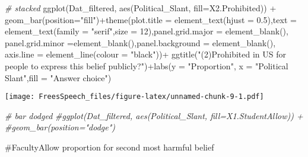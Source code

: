 \documentclass[
]{article}
\newenvironment{Shaded}{\begin{snugshade}}{\end{snugshade}}
\newcommand{\AttributeTok}[1]{\textcolor[rgb]{0.77,0.63,0.00}{#1}}
\newcommand{\CommentTok}[1]{\textcolor[rgb]{0.56,0.35,0.01}{\textit{#1}}}
\newcommand{\DecValTok}[1]{\textcolor[rgb]{0.00,0.00,0.81}{#1}}
\newcommand{\FloatTok}[1]{\textcolor[rgb]{0.00,0.00,0.81}{#1}}
\newcommand{\FunctionTok}[1]{\textcolor[rgb]{0.00,0.00,0.00}{#1}}
\newcommand{\NormalTok}[1]{#1}
\newcommand{\SpecialCharTok}[1]{\textcolor[rgb]{0.00,0.00,0.00}{#1}}
\newcommand{\StringTok}[1]{\textcolor[rgb]{0.31,0.60,0.02}{#1}}
\begin{document}
\begin{Shaded}
\begin{Highlighting}[]
\CommentTok{\# stacked}
\FunctionTok{ggplot}\NormalTok{(Dat\_filtered, }\FunctionTok{aes}\NormalTok{(Political\_Slant, }\AttributeTok{fill=}\NormalTok{X2.Prohibited)) }\SpecialCharTok{+} 
  \FunctionTok{geom\_bar}\NormalTok{(}\AttributeTok{position=}\StringTok{"fill"}\NormalTok{)}\SpecialCharTok{+}\FunctionTok{theme}\NormalTok{(}\AttributeTok{plot.title =} \FunctionTok{element\_text}\NormalTok{(}\AttributeTok{hjust =} \FloatTok{0.5}\NormalTok{),}\AttributeTok{text =} \FunctionTok{element\_text}\NormalTok{(}\AttributeTok{family =} \StringTok{"serif"}\NormalTok{,}\AttributeTok{size =} \DecValTok{12}\NormalTok{),}\AttributeTok{panel.grid.major =} \FunctionTok{element\_blank}\NormalTok{(), }\AttributeTok{panel.grid.minor =}\FunctionTok{element\_blank}\NormalTok{(),}\AttributeTok{panel.background =} \FunctionTok{element\_blank}\NormalTok{(), }\AttributeTok{axis.line =} \FunctionTok{element\_line}\NormalTok{(}\AttributeTok{colour =} \StringTok{"black"}\NormalTok{))}\SpecialCharTok{+}
\FunctionTok{ggtitle}\NormalTok{(}\StringTok{"(2)Prohibited in US for people to express this belief publicly?"}\NormalTok{)}\SpecialCharTok{+}\FunctionTok{labs}\NormalTok{(}\AttributeTok{y =} \StringTok{"Proportion"}\NormalTok{, }\AttributeTok{x =} \StringTok{"Political Slant"}\NormalTok{,}\AttributeTok{fill =} \StringTok{"Answer choice"}\NormalTok{)}
\end{Highlighting}
\end{Shaded}

\texttt{[image: FreesSpeech\_files/figure-latex/unnamed-chunk-9-1.pdf]}

\begin{Shaded}
\begin{Highlighting}[]
\CommentTok{\# bar dodged}
\CommentTok{\#ggplot(Dat\_filtered, aes(Political\_Slant, fill=X1.StudentAllow)) + }
  \CommentTok{\#geom\_bar(position="dodge")}
\end{Highlighting}
\end{Shaded}

\#FacultyAllow proportion for second most harmful belief
\end{document}
